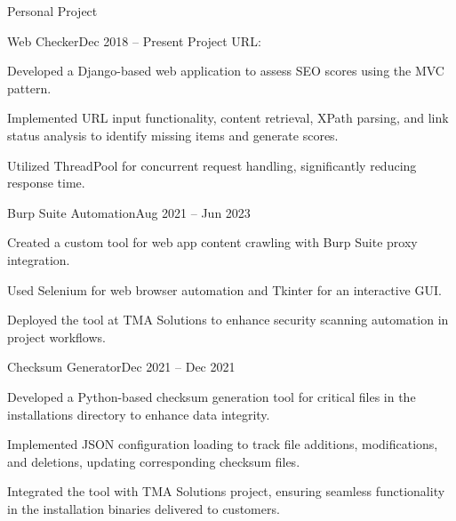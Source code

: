 \documentclass[12pt,a4paper]{cv}
\begin{document}
\begin{cvSection}{Personal Project}

	\begin{cvSubsection}{Web Checker}{Dec 2018 -- Present}{
			Project URL: 
		}
		\item Developed a Django-based web application to assess SEO scores using the MVC pattern.
		\item Implemented URL input functionality, content retrieval, XPath parsing, and link status analysis to identify missing items and generate scores.
		\item Utilized ThreadPool for concurrent request handling, significantly reducing response time.
	\end{cvSubsection}


	\begin{cvSubsection}{Burp Suite Automation}{Aug 2021 -- Jun 2023}{}
		\item Created a custom tool for web app content crawling with Burp Suite proxy integration.
		\item Used Selenium for web browser automation and Tkinter for an interactive GUI.
		\item Deployed the tool at TMA Solutions to enhance security scanning automation in project workflows.
	\end{cvSubsection}


	\begin{cvSubsection}{Checksum Generator}{Dec 2021 -- Dec 2021}{}
		\item Developed a Python-based checksum generation tool for critical files in the installations directory to enhance data integrity.
		\item Implemented JSON configuration loading to track file additions, modifications, and deletions, updating corresponding checksum files.
		\item Integrated the tool with TMA Solutions project, ensuring seamless functionality in the installation binaries delivered to customers.
	\end{cvSubsection}

\end{cvSection}
\end{document}
